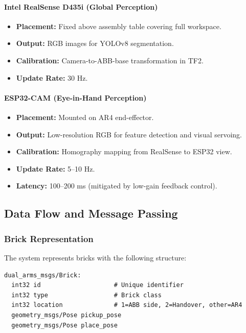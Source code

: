 \paragraph{Intel RealSense D435i (Global Perception)}
\begin{itemize}
    \item \textbf{Placement:} Fixed above assembly table covering full workspace.
    \item \textbf{Output:} RGB images for YOLOv8 segmentation.
    \item \textbf{Calibration:} Camera-to-ABB-base transformation in TF2.
    \item \textbf{Update Rate:} 30 Hz.
\end{itemize}

\paragraph{ESP32-CAM (Eye-in-Hand Perception)}
\begin{itemize}
    \item \textbf{Placement:} Mounted on AR4 end-effector.
    \item \textbf{Output:} Low-resolution RGB for feature detection and visual servoing.
    \item \textbf{Calibration:} Homography mapping from RealSense to ESP32 view.
    \item \textbf{Update Rate:} 5--10 Hz.
    \item \textbf{Latency:} 100--200 ms (mitigated by low-gain feedback control).
\end{itemize}

\subsection{Data Flow and Message Passing}

\subsubsection{Brick Representation}

The system represents bricks with the following structure:
\begin{verbatim}
dual_arms_msgs/Brick:
  int32 id                    # Unique identifier
  int32 type                  # Brick class
  int32 location              # 1=ABB side, 2=Handover, other=AR4
  geometry_msgs/Pose pickup_pose
  geometry_msgs/Pose place_pose
\end{verbatim}

